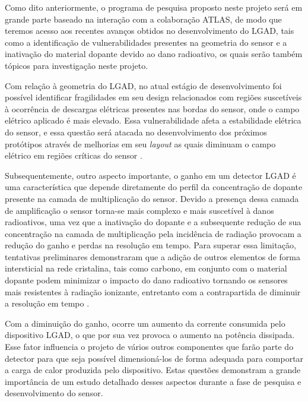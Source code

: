 Como dito anteriormente, o programa de pesquisa proposto neste projeto será em grande parte baseado na interação com a colaboração ATLAS, de modo que teremos acesso aos recentes avanços obtidos no desenvolvimento do LGAD, tais como a identificação de vulnerabilidades presentes na geometria do sensor e a inativação do material dopante devido ao dano radioativo, os quais serão também tópicos para investigação neste projeto.

Com relação à geometria do LGAD, no atual estágio de desenvolvimento foi possível identificar fragilidades em seu design relacionados com regiões suscetíveis à ocorrência de descargas elétricas presentes nas bordas do sensor, onde o campo elétrico aplicado é mais elevado. Essa vulnerabilidade afeta a estabilidade elétrica do sensor, e essa questão será atacada no desenvolvimento dos próximos protótipos através de melhorias em seu {\it layout} as quais diminuam o campo elétrico em regiões críticas do sensor \cite{tdr}.  
   
Subsequentemente, outro aspecto importante, o ganho em um detector LGAD é uma característica que depende diretamente do perfil da concentração de dopante presente na camada de multiplicação do sensor. Devido a presença dessa camada de amplificação o sensor torna-se mais complexo e mais suscetível à danos radioativos, uma vez que a inativação do dopante e a subsequente redução de sua concentração na camada de multiplicação pela incidência de radiação provocam a redução do ganho e perdas na resolução em tempo. Para superar essa limitação, tentativas preliminares demonstraram que a adição de outros elementos de forma intersticial na rede cristalina, tais como carbono, em conjunto com o material dopante podem minimizar o impacto do dano radioativo tornando os sensores mais resistentes à radiação ionizante, entretanto com a contrapartida de diminuir a resolução em tempo \cite{tdr}. 

Com a diminuição do ganho, ocorre um aumento da corrente consumida pelo dispositivo LGAD, o que por sua vez provoca o aumento na potência dissipada. Esse fator influencia o projeto de vários outros componentes que farão parte do detector para que seja possível dimensioná-los de forma adequada para comportar a carga de calor produzida pelo dispositivo. Estas questões  demonstram a grande importância de um estudo detalhado desses aspectos durante a fase de pesquisa e desenvolvimento do sensor. %

